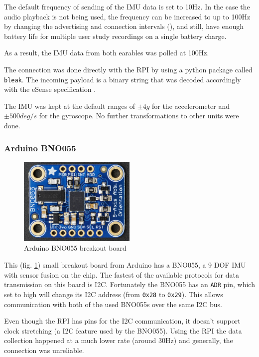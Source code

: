 The default frequency of sending of the IMU data is set to 10Hz. In the case the audio playback is not being used, the frequency can be increased to up to 100Hz by changing the advertising and connection intervals (\cite{esense_ble_specification}), and still, have enough battery life for multiple user study recordings on a single battery charge. 

As a result, the IMU data from both earables was polled at 100Hz.

The connection was done directly with the RPI by using a python package called \texttt{bleak}. The incoming payload is a binary string that was decoded accordingly with the eSense specification \cite{esense_ble_specification}.

The IMU was kept at the default ranges of $\pm 4g$ for the accelerometer and $\pm 500deg/s$ for the gyroscope. No further transformations to other units were done.


\subsubsection{Arduino BNO055}
\label{subsub:bno}

\begin{figure}[h!]
\centering
\includegraphics[width=0.5\textwidth]{src/media/hardware/bno.jpg}
\caption{Arduino BNO055 breakout board}
\label{image:bno}
\end{figure}

This (fig. \ref{image:bno}) small breakout board from Arduino has a BNO055, a 9 DOF IMU with sensor fusion on the chip. The fastest of the available protocols for data transmission on this board is I2C. Fortunately the BNO055 has an \texttt{ADR} pin, which  set to high will change its I2C address (from \texttt{0x28} to \texttt{0x29}). This allows communication with both of the used BNO055s over the same I2C bus.

Even though the RPI has pins for the I2C communication, it doesn't support clock stretching (a I2C feature used by the BNO055). Using the RPI the data collection happened at a much lower rate (around 30Hz) and generally, the connection was unreliable.


